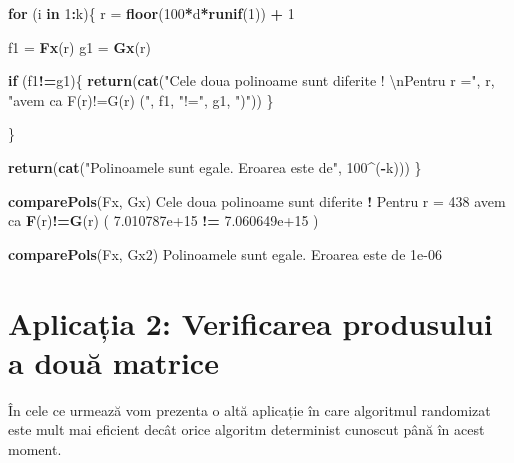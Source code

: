 \documentclass[]{article}
\newenvironment{Shaded}{\begin{snugshade}}{\end{snugshade}}
\newcommand{\CharTok}[1]{\textcolor[rgb]{0.31,0.60,0.02}{#1}}
\newcommand{\ControlFlowTok}[1]{\textcolor[rgb]{0.13,0.29,0.53}{\textbf{#1}}}
\newcommand{\DecValTok}[1]{\textcolor[rgb]{0.00,0.00,0.81}{#1}}
\newcommand{\FloatTok}[1]{\textcolor[rgb]{0.00,0.00,0.81}{#1}}
\newcommand{\KeywordTok}[1]{\textcolor[rgb]{0.13,0.29,0.53}{\textbf{#1}}}
\newcommand{\NormalTok}[1]{#1}
\newcommand{\OperatorTok}[1]{\textcolor[rgb]{0.81,0.36,0.00}{\textbf{#1}}}
\newcommand{\StringTok}[1]{\textcolor[rgb]{0.31,0.60,0.02}{#1}}
\begin{document}
\begin{Shaded}
\begin{Highlighting}[]
  \ControlFlowTok{for}\NormalTok{ (i }\ControlFlowTok{in} \DecValTok{1}\OperatorTok{:}\NormalTok{k)\{}
\NormalTok{    r =}\StringTok{ }\KeywordTok{floor}\NormalTok{(}\DecValTok{100}\OperatorTok{*}\NormalTok{d}\OperatorTok{*}\KeywordTok{runif}\NormalTok{(}\DecValTok{1}\NormalTok{)) }\OperatorTok{+}\StringTok{ }\DecValTok{1}
    
\NormalTok{    f1 =}\StringTok{ }\KeywordTok{Fx}\NormalTok{(r)}
\NormalTok{    g1 =}\StringTok{ }\KeywordTok{Gx}\NormalTok{(r)}
    
    \ControlFlowTok{if}\NormalTok{ (f1}\OperatorTok{!=}\NormalTok{g1)\{}
      \KeywordTok{return}\NormalTok{(}\KeywordTok{cat}\NormalTok{(}\StringTok{"Cele doua polinoame sunt diferite ! }\CharTok{\textbackslash{}n}\StringTok{Pentru r ="}\NormalTok{, }
\NormalTok{                         r, }\StringTok{"avem ca F(r)!=G(r) ("}\NormalTok{, f1, }\StringTok{"!="}\NormalTok{, g1, }\StringTok{")"}\NormalTok{))}
\NormalTok{    \}}
    
\NormalTok{  \}}
  
  \KeywordTok{return}\NormalTok{(}\KeywordTok{cat}\NormalTok{(}\StringTok{"Polinoamele sunt egale. Eroarea este de"}\NormalTok{, }\DecValTok{100}\OperatorTok{^}\NormalTok{(}\OperatorTok{-}\NormalTok{k)))}
\NormalTok{\}}

\KeywordTok{comparePols}\NormalTok{(Fx, Gx)}
\NormalTok{Cele doua polinoame sunt diferite }\OperatorTok{!}\StringTok{ }
\NormalTok{Pentru r =}\StringTok{ }\DecValTok{438}\NormalTok{ avem ca }\KeywordTok{F}\NormalTok{(r)}\OperatorTok{!=}\KeywordTok{G}\NormalTok{(r) ( }\FloatTok{7.010787e+15} \OperatorTok{!=}\StringTok{ }\FloatTok{7.060649e+15}\NormalTok{ )}

\KeywordTok{comparePols}\NormalTok{(Fx, Gx2)}
\NormalTok{Polinoamele sunt egale. Eroarea este de }\FloatTok{1e-06}
\end{Highlighting}
\end{Shaded}

\hypertarget{aplicaux21bia-2-verificarea-produsului-a-douux103-matrice}{%
\section{Aplicația 2: Verificarea produsului a două
matrice}\label{aplicaux21bia-2-verificarea-produsului-a-douux103-matrice}}

În cele ce urmează vom prezenta o altă aplicație în care algoritmul
randomizat este mult mai eficient decât orice algoritm determinist
cunoscut până în acest moment.
\end{document}
